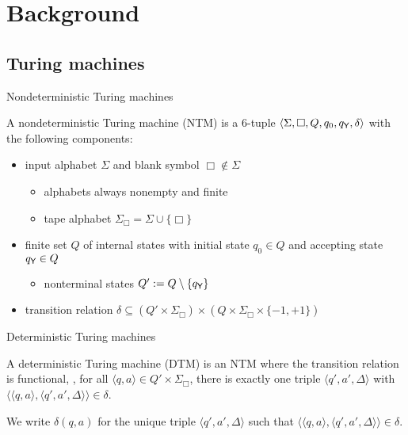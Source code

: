 \documentclass{gkibeamer}
\begin{document}
\section{Background}
\subsection{Turing machines}

\begin{frame}{Nondeterministic Turing machines}
  \begin{definition}
    A \alert{nondeterministic Turing machine (NTM)} is a 6-tuple
    $\langle \Sigma, \Box, Q, q_0, q_{\textsf{Y}}, \delta\rangle$ with the
    following components:
    \begin{itemize}
    \item \alert{input alphabet} $\Sigma$ and \alert{blank symbol}
      $\Box \notin \Sigma$
      \begin{itemize}
      \item alphabets always nonempty and finite
      \item \alert{tape alphabet} $\Sigma_\Box = \Sigma \cup \{\Box\}$
      \end{itemize}
    \item finite set $Q$ of \alert{internal states} with \alert{initial
      state} $q_0 \in Q$ and \alert{accepting state} $q_{\textsf{Y}} \in Q$
      \begin{itemize}
      \item \alert{nonterminal states} $Q' := Q \setminus \{q_{\textsf{Y}}\}$
      \end{itemize}
    \item \alert{transition relation}
      $\delta \subseteq (Q' \times \Sigma_\Box) \times (Q \times
      \Sigma_\Box \times \{-1,+1\})$
    \end{itemize}
  \end{definition}
\end{frame}

\begin{frame}{Deterministic Turing machines}
  \begin{definition}
    A \alert{deterministic Turing machine (DTM)}
    is an NTM
    where the transition relation is \alert{functional}, \ie,
    for all $\langle q, a\rangle \in Q' \times \Sigma_\Box$, there is
    exactly one triple $\langle q', a', \Delta\rangle$ with
    $\langle\langle q,a\rangle, \langle q', a',\Delta\rangle\rangle
    \in \delta$.

    \medskip

     We write $\delta(q, a)$ for the unique triple
    $\langle q', a', \Delta\rangle$ such that $\langle\langle q,
    a\rangle, \langle q', a', \Delta\rangle\rangle \in \delta$.
  \end{definition}
\end{frame}
\end{document}
